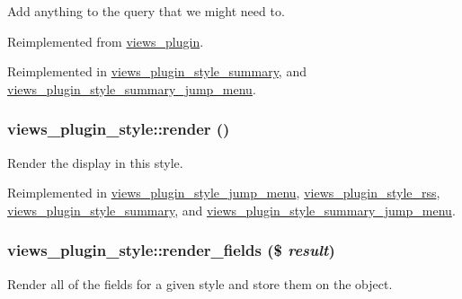 Add anything to the query that we might need to. 

Reimplemented from \hyperlink{classviews__plugin_10ac07c47c4a8735786f9fcc38548587}{views\_\-plugin}.

Reimplemented in \hyperlink{classviews__plugin__style__summary_fd8f02a61bd0e1887cc7767950e8e0df}{views\_\-plugin\_\-style\_\-summary}, and \hyperlink{classviews__plugin__style__summary__jump__menu_ee2a45ee02a7ce8d041a5b028758cf0b}{views\_\-plugin\_\-style\_\-summary\_\-jump\_\-menu}.\hypertarget{classviews__plugin__style_a52b618e91b11a7d10ad1feadbc891f1}{
\subsubsection[{render}]{\setlength{\rightskip}{0pt plus 5cm}views\_\-plugin\_\-style::render ()}}
\label{classviews__plugin__style_a52b618e91b11a7d10ad1feadbc891f1}


Render the display in this style. 

Reimplemented in \hyperlink{classviews__plugin__style__jump__menu_ebc54d57acea582a05435beccaa26fef}{views\_\-plugin\_\-style\_\-jump\_\-menu}, \hyperlink{classviews__plugin__style__rss_a6331538ac5b9cdc80478f98ba5e0de4}{views\_\-plugin\_\-style\_\-rss}, \hyperlink{classviews__plugin__style__summary_240be31b796b50331a25cf30818e584f}{views\_\-plugin\_\-style\_\-summary}, and \hyperlink{classviews__plugin__style__summary__jump__menu_7e9b8b44735067dc7ebb838e54a21a38}{views\_\-plugin\_\-style\_\-summary\_\-jump\_\-menu}.\hypertarget{classviews__plugin__style_95d504017017c611b482a920119452db}{
\subsubsection[{render\_\-fields}]{\setlength{\rightskip}{0pt plus 5cm}views\_\-plugin\_\-style::render\_\-fields (\$ {\em result})}}
\label{classviews__plugin__style_95d504017017c611b482a920119452db}


Render all of the fields for a given style and store them on the object.

